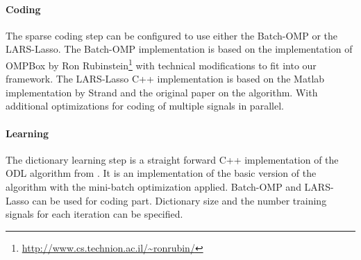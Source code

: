 \paragraph{Coding}
The sparse coding step can be configured to use either the Batch-OMP 
or the LARS-Lasso.
The Batch-OMP implementation is based on the implementation
of OMPBox by Ron
Rubinstein\footnote{\url{http://www.cs.technion.ac.il/~ronrubin/}} with
technical modifications to fit into our
framework. The LARS-Lasso C++ implementation is based on the Matlab
implementation by Strand\cite{Strand2005} and the original
paper\cite{Efron2004} on the algorithm. With additional optimizations
for coding of multiple signals in parallel. 

\paragraph{Learning}
The dictionary learning step is a straight forward C++ implementation of the
ODL algorithm from . It is an
implementation of the
basic version of the algorithm with the mini-batch optimization applied.
Batch-OMP and LARS-Lasso can be used for coding part.
Dictionary size and the number training signals for each iteration can be
specified.

